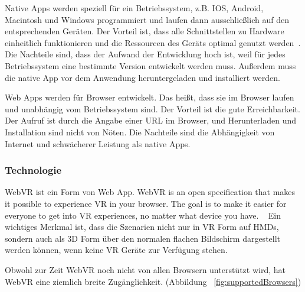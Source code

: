  Native Apps werden speziell für ein Betriebssystem, z.B. IOS, Android, Macintosh und Windows programmiert und laufen dann ausschließlich auf den entsprechenden Geräten. Der Vorteil ist, \glqq dass alle Schnittstellen zu Hardware einheitlich funktionieren und die Ressourcen des Geräts optimal genutzt werden\grqq\ \citep{22}. Die Nachteile sind, dass der Aufwand der Entwicklung hoch ist, weil für jedes Betriebssystem eine bestimmte Version entwickelt werden muss. Außerdem muss die native App vor dem Anwendung heruntergeladen und installiert werden.
 
 Web Apps werden für Browser entwickelt. Das heißt, dass sie im Browser laufen und unabhängig vom Betriebssystem sind. Der Vorteil ist die gute Erreichbarkeit. Der Aufruf ist durch die Angabe einer URL im Browser, und Herunterladen und Installation sind nicht von Nöten. Die Nachteile sind die Abhängigkeit von Internet und schwächerer Leistung als native Apps.
 
  \subsubsection{Technologie}
 WebVR ist ein Form von Web App. \glqq WebVR is an open specification that makes it possible to experience VR in your browser. The goal is to make it easier for everyone to get into VR experiences, no matter what device you have. \grqq\ \citep{21} Ein wichtiges Merkmal ist, dass die Szenarien nicht nur in VR Form auf HMDs, sondern auch als 3D Form über den normalen flachen Bildschirm dargestellt werden können, wenn keine VR Geräte zur Verfügung stehen.
 
 Obwohl zur Zeit WebVR noch nicht von allen Browsern unterstützt wird, hat WebVR eine ziemlich breite Zugänglichkeit. (Abbildung ~\ref{fig:supportedBrowsers})
 
